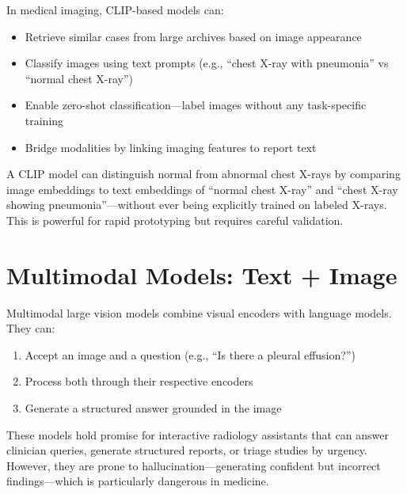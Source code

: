In medical imaging, CLIP-based models can:
\begin{itemize}
    \item Retrieve similar cases from large archives based on image appearance
    \item Classify images using text prompts (e.g., ``chest X-ray with pneumonia'' vs ``normal chest X-ray'')
    \item Enable zero-shot classification---label images without any task-specific training
    \item Bridge modalities by linking imaging features to report text
\end{itemize}

\begin{pearlbox}
A CLIP model can distinguish normal from abnormal chest X-rays by comparing image embeddings to text embeddings of ``normal chest X-ray'' and ``chest X-ray showing pneumonia''---without ever being explicitly trained on labeled X-rays. This is powerful for rapid prototyping but requires careful validation.
\end{pearlbox}

\section{Multimodal Models: Text + Image}
Multimodal large vision models combine visual encoders with language models. They can:
\begin{enumerate}
    \item Accept an image and a question (e.g., ``Is there a pleural effusion?'')
    \item Process both through their respective encoders
    \item Generate a structured answer grounded in the image
\end{enumerate}

These models hold promise for interactive radiology assistants that can answer clinician queries, generate structured reports, or triage studies by urgency. However, they are prone to hallucination---generating confident but incorrect findings---which is particularly dangerous in medicine.

